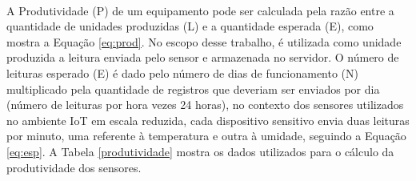 \begin{center}
\label{disponibilidade}
\end{center}


\\\null \quad A Produtividade (P) de um equipamento pode ser calculada pela razão entre a quantidade de unidades produzidas (L) e a quantidade esperada (E), como mostra a Equação \ref{eq:prod}. No escopo desse trabalho, é utilizada como unidade produzida a leitura enviada pelo sensor e armazenada no servidor. O número de leituras esperado (E) é dado pelo número de dias de funcionamento (N) multiplicado pela quantidade de registros que deveriam ser enviados por dia (número de leituras por hora vezes 24 horas), no contexto dos sensores utilizados no ambiente \acrshort{IoT} em escala reduzida, cada dispositivo sensitivo envia duas leituras por minuto, uma referente à temperatura e outra à umidade,  seguindo a Equação \ref{eq:esp}. A Tabela \ref{produtividade} mostra os dados utilizados para o cálculo da produtividade dos sensores.

